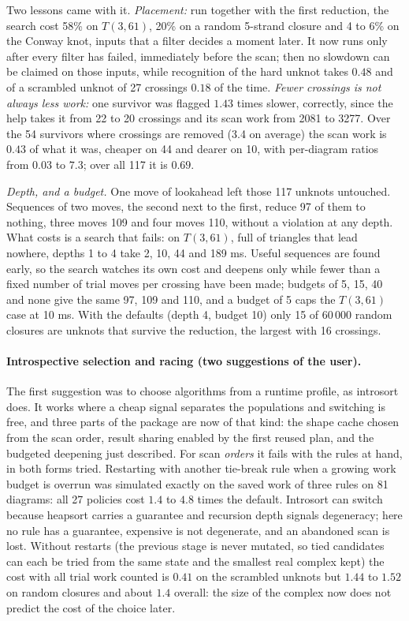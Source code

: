 Two lessons came with it. \emph{Placement:} run together with the first
reduction, the search cost 58\% on $T(3,61)$, 20\% on a random 5-strand closure
and 4 to 6\% on the Conway knot, inputs that a filter decides a moment later.
It now runs only after every filter has failed, immediately before the scan;
then no slowdown can be claimed on those inputs, while recognition of the hard
unknot takes $0.48$ and of a scrambled unknot of 27 crossings $0.18$ of the
time. \emph{Fewer crossings is not always less work:} one survivor was flagged
$1.43$ times slower, correctly, since the help takes it from 22 to 20 crossings
and its scan work from 2081 to 3277. Over the 54 survivors where crossings are
removed (3.4 on average) the scan work is $0.43$ of what it was, cheaper on 44
and dearer on 10, with per-diagram ratios from $0.03$ to $7.3$; over all 117 it
is $0.69$.

\emph{Depth, and a budget.} One move of lookahead left those 117 unknots
untouched. Sequences of two moves, the second next to the first, reduce 97 of
them to nothing, three moves 109 and four moves 110, without a violation at any
depth. What costs is a search that fails: on $T(3,61)$, full of triangles that
lead nowhere, depths 1 to 4 take 2, 10, 44 and 189 ms. Useful sequences are
found early, so the search watches its own cost and deepens only while fewer
than a fixed number of trial moves per crossing have been made; budgets of 5,
15, 40 and none give the same 97, 109 and 110, and a budget of 5 caps the
$T(3,61)$ case at 10 ms. With the defaults (depth 4, budget 10) only 15 of
60\,000 random closures are unknots that survive the reduction, the largest
with 16 crossings.

\paragraph{Introspective selection and racing (two suggestions of the user).}
The first suggestion was to choose algorithms from a runtime profile, as
introsort does. It works where a cheap signal separates the populations and
switching is free, and three parts of the package are now of that kind: the
shape cache chosen from the scan order, result sharing enabled by the first
reused plan, and the budgeted deepening just described. For scan \emph{orders}
it fails with the rules at hand, in both forms tried. Restarting with another
tie-break rule when a growing work budget is overrun was simulated exactly on
the saved work of three rules on 81 diagrams: all 27 policies cost $1.4$ to
$4.8$ times the default. Introsort can switch because heapsort carries a
guarantee and recursion depth signals degeneracy; here no rule has a
guarantee, expensive is not degenerate, and an abandoned scan is lost. Without
restarts (the previous stage is never mutated, so tied candidates can each be
tried from the same state and the smallest real complex kept) the cost with all
trial work counted is $0.41$ on the scrambled unknots but $1.44$ to $1.52$ on
random closures and about $1.4$ overall: the size of the complex now does not
predict the cost of the choice later.

